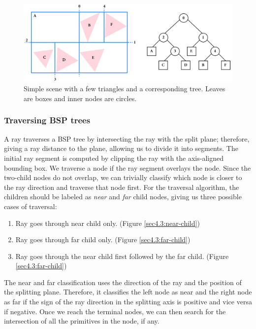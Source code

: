 \documentclass[a4paper,11pt,oneside]{article}
\begin{document}
\begin{figure}[ht]
	\begin{center}
		\includegraphics[width=\textwidth]{section4/4.3/bsp-tree-example.png}
	\end{center}
	\caption{Simple scene with a few triangles and a corresponding tree. Leaves are boxes and inner nodes are circles.}
	\label{sec4.3:example-kd-tree}
\end{figure}

\subsubsection{Traversing BSP trees}

A ray traverses a BSP tree by intersecting the ray with the split plane; therefore, giving a ray distance to the plane, allowing us to divide it into segments. The initial ray segment is computed by clipping the ray with the axis-aligned bounding box. We traverse a node if the ray segment overlays the node. Since the two-child nodes do not overlap, we can trivially classify which node is closer to the ray direction and traverse that node first. For the traversal algorithm, the children should be labeled as \textit{near} and \textit{far} child nodes, giving us three possible cases of traversal:

\begin{enumerate}
	\item Ray goes through near child only. (Figure \ref{sec4.3:near-child})
	\item Ray goes through far child only. (Figure \ref{sec4.3:far-child})
	\item Ray goes through the near child first followed by the far child. (Figure \ref{sec4.3:far-child})
\end{enumerate}

The near and far classification uses the direction of the ray and the position of the splitting plane. Therefore, it classifies the left node as near and the right node as far if the sign of the ray direction in the splitting axis is positive and vice versa if negative. Once we reach the terminal nodes, we can then search for the intersection of all the primitives in the node, if any.
\end{document}
